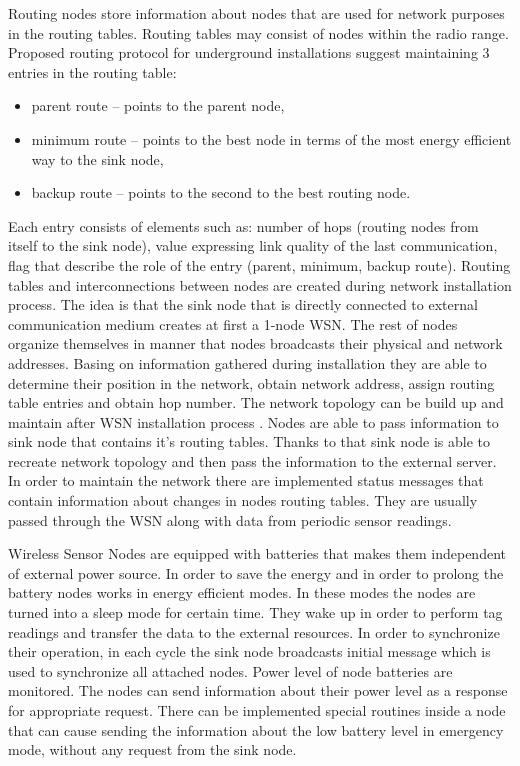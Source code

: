 \documentclass[../main.tex]{subfiles}
\begin{document}
Routing nodes store information about nodes that are used for network purposes in the routing tables. Routing tables may consist of nodes within the radio range. Proposed routing protocol for underground installations suggest maintaining 3 entries in the routing table\cite{WSN_monitoring}:

\begin{itemize}
	\item parent route -- points to the parent node,
	\item minimum route -- points to the best node in terms of the most energy efficient way to the sink node,
	\item backup route -- points to the second to the best routing node.
\end{itemize}

Each entry consists of elements such as: number of hops (routing nodes from itself to the sink node), value expressing link quality of the last communication, flag that describe the role of the entry (parent, minimum, backup route). Routing tables and interconnections between nodes are created during network installation process. The idea is that the sink node that is directly connected to external communication medium creates at first a 1-node WSN. The rest of nodes organize themselves in manner that nodes broadcasts their physical and network addresses. Basing on information gathered during installation they are able to determine their position in the network, obtain network address, assign routing table entries and obtain hop number. The network topology can be build up and maintain after WSN installation process \cite{ZigBee_applications}. Nodes are able to pass information to sink node that contains it's routing tables. Thanks to that sink node is able to recreate network topology and then pass the information to the external server. In order to maintain the network there are implemented status messages that contain information about changes in nodes routing tables. They are usually passed through the WSN along with data from periodic sensor readings.

Wireless Sensor Nodes are equipped with batteries that makes them independent of external power source. In order to save the energy and in order to prolong the battery nodes works in energy efficient modes. In these modes the nodes are turned into a sleep mode for certain time. They wake up in order to perform tag readings and transfer the data to the external resources. In order to synchronize their operation, in each cycle the sink node broadcasts initial message which is used to synchronize all attached nodes. Power level of node batteries are monitored. The nodes can send information about their power level as a response for appropriate request. There can be implemented special routines inside a node that can cause sending the information about the low battery level in emergency mode, without any request from the sink node.
\end{document}
